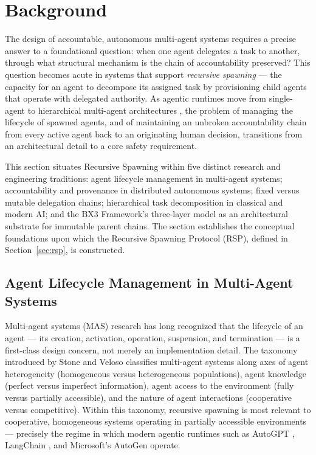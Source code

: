 \section{Background}
\label{sec:background}

The design of accountable, autonomous multi-agent systems requires a precise answer to a foundational question: when one agent delegates a task to another, through what structural mechanism is the chain of accountability preserved? This question becomes acute in systems that support \emph{recursive spawning} --- the capacity for an agent to decompose its assigned task by provisioning child agents that operate with delegated authority. As agentic runtimes move from single-agent to hierarchical multi-agent architectures \cite{wooldridge1995,stone2000}, the problem of managing the lifecycle of spawned agents, and of maintaining an unbroken accountability chain from every active agent back to an originating human decision, transitions from an architectural detail to a core safety requirement.

This section situates Recursive Spawning within five distinct research and engineering traditions: agent lifecycle management in multi-agent systems; accountability and provenance in distributed autonomous systems; fixed versus mutable delegation chains; hierarchical task decomposition in classical and modern AI; and the BX3 Framework's three-layer model as an architectural substrate for immutable parent chains. The section establishes the conceptual foundations upon which the Recursive Spawning Protocol (RSP), defined in Section~\ref{sec:rsp}, is constructed.

\subsection{Agent Lifecycle Management in Multi-Agent Systems}

Multi-agent systems (MAS) research has long recognized that the lifecycle of an agent --- its creation, activation, operation, suspension, and termination --- is a first-class design concern, not merely an implementation detail. The taxonomy introduced by Stone and Veloso \cite{stone2000} classifies multi-agent systems along axes of agent heterogeneity (homogeneous versus heterogeneous populations), agent knowledge (perfect versus imperfect information), agent access to the environment (fully versus partially accessible), and the nature of agent interactions (cooperative versus competitive). Within this taxonomy, recursive spawning is most relevant to cooperative, homogeneous systems operating in partially accessible environments --- precisely the regime in which modern agentic runtimes such as AutoGPT \cite{autogpt2023}, LangChain \cite{langchain2023}, and Microsoft's AutoGen \cite{autogen2023} operate.

